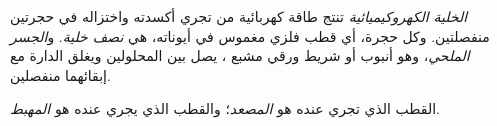 \begin{definition}\label{def:g12:cells-and-electrolysis:cell}
\emph{الخلية الكهروكيميائية} تنتج
طاقة كهربائية من  تجري أكسدته واختزاله
في حجرتين منفصلتين. وكل حجرة، أي قطب فلزي
مغموس في  أيوناته، هي
\emph{نصف خلية}. و\emph{الجسر الملحي}،
وهو أنبوب أو شريط ورقي مشبع  ، يصل بين
المحلولين ويغلق الدارة مع إبقائهما منفصلين.
\end{definition}

\begin{definition}\label{def:g12:cells-and-electrolysis:anode}
القطب الذي تجري عنده  هو
\emph{المصعد}؛ والقطب الذي يجري عنده 
هو \emph{المهبط}.
\end{definition}

